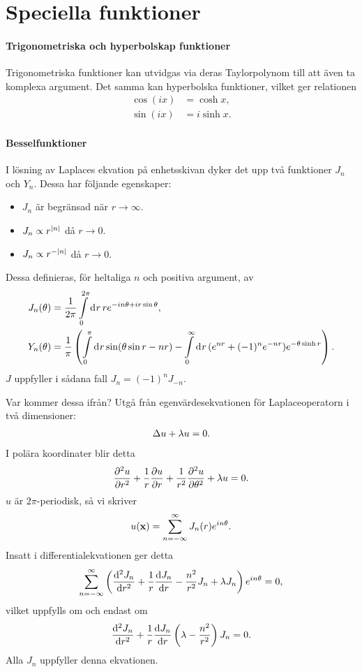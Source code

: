 \section{Speciella funktioner}

\paragraph{Trigonometriska och hyperbolskap funktioner}
Trigonometriska funktioner kan utvidgas via deras Taylorpolynom till att även ta komplexa argument. Det samma kan hyperbolska funktioner, vilket ger relationen
\begin{align*}
	\cos(ix) &= \cosh{x}, \\
	\sin(ix) &= i\sinh{x}.
\end{align*}

\paragraph{Besselfunktioner}
I lösning av Laplaces ekvation på enhetsskivan dyker det upp två funktioner $J_{n}$ och $Y_{n}$. Dessa har följande egenskaper:
\begin{itemize}
	\item $J_{n}$ är begränsad när $r\to\infty$.
	\item $J_{n}\propto r^{\abs{n}}$ då $r\to 0$.
	\item $J_{n}\propto r^{-\abs{n}}$ då $r\to 0$.
\end{itemize}
Dessa definieras, för heltaliga $n$ och positiva argument, av
\begin{align*}
	J_{n}(\theta) &= \frac{1}{2\pi}\int\limits_{0}^{2\pi}\dd[]{r}re^{-in\theta + ir\sin{\theta}}, \\
	Y_{n}(\theta) &= \frac{1}{\pi}\left(\int\limits_{0}^{\pi}\dd[]{r}\sin(\theta\sin{r} - nr) - \int\limits_{0}^{\infty}\dd[]{r}(e^{nr} + (-1)^{n}e^{-nr})e^{-\theta\sinh{r}}\right).
\end{align*}
$J$ uppfyller i sådana fall $J_{n} = (-1)^{n}J_{-n}$.

Var kommer dessa ifrån? Utgå från egenvärdesekvationen för Laplaceoperatorn i två dimensioner:
\begin{align*}
	\Delta u + \lambda u = 0.
\end{align*}
I polära koordinater blir detta
\begin{align*}
	\pdv[2]{u}{r} + \frac{1}{r}\pdv{u}{r} + \frac{1}{r^{2}}\pdv[2]{u}{\theta} + \lambda u = 0.
\end{align*}
$u$ är $2\pi$-periodisk, så vi skriver
\begin{align*}
	u(\vb{x}) = \sum\limits_{n = -\infty}^{\infty}J_{n}(r)e^{in\theta}.
\end{align*}
Insatt i differentialekvationen ger detta
\begin{align*}
	\sum\limits_{n = -\infty}^{\infty}\left(\dv[2]{J_{n}}{r} + \frac{1}{r}\dv{J_{n}}{r} - \frac{n^{2}}{r^{2}}J_{n} + \lambda J_{n}\right)e^{in\theta} = 0,
\end{align*}
vilket uppfylls om och endast om
\begin{align*}
	\dv[2]{J_{n}}{r} + \frac{1}{r}\dv{J_{n}}{r} \left(\lambda - \frac{n^{2}}{r^{2}}\right)J_{n} = 0.
\end{align*}
Alla $J_{n}$ uppfyller denna ekvationen.

